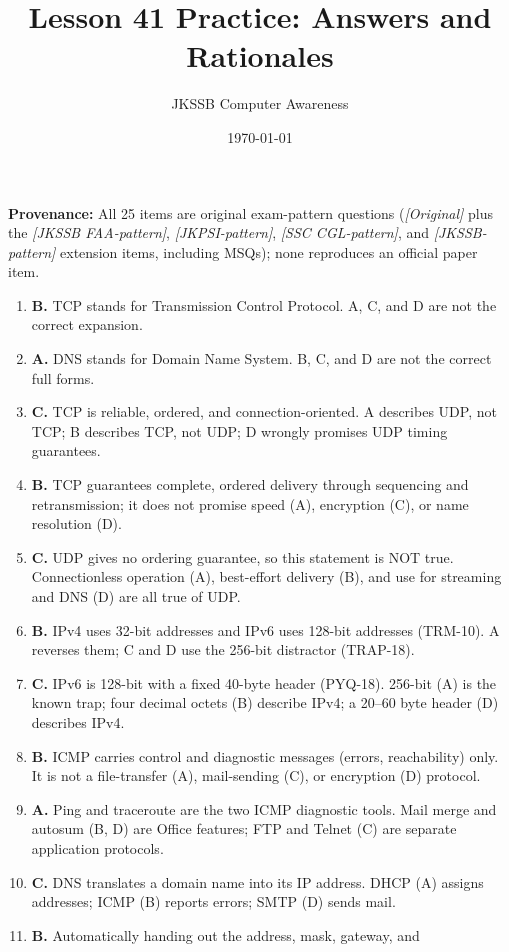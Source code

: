 \documentclass[11pt]{article}
\title{Lesson 41 Practice: Answers and Rationales}
\author{JKSSB Computer Awareness}
\date{\today}
\begin{document}
\maketitle
\noindent\textbf{Provenance:} All 25 items are original exam-pattern questions (\textit{[Original]} plus the \textit{[JKSSB FAA-pattern]}, \textit{[JKPSI-pattern]}, \textit{[SSC CGL-pattern]}, and \textit{[JKSSB-pattern]} extension items, including MSQs); none reproduces an official paper item.
\begin{enumerate}[label=\textbf{Q\arabic*.}, leftmargin=*]
\item \textbf{B.} TCP stands for Transmission Control Protocol. A, C, and D
  are not the correct expansion.
\item \textbf{A.} DNS stands for Domain Name System. B, C, and D are not the
  correct full forms.
\item \textbf{C.} TCP is reliable, ordered, and connection-oriented. A
  describes UDP, not TCP; B describes TCP, not UDP; D wrongly promises UDP
  timing guarantees.
\item \textbf{B.} TCP guarantees complete, ordered delivery through
  sequencing and retransmission; it does not promise speed (A), encryption
  (C), or name resolution (D).
\item \textbf{C.} UDP gives no ordering guarantee, so this statement is NOT
  true. Connectionless operation (A), best-effort delivery (B), and use for
  streaming and DNS (D) are all true of UDP.
\item \textbf{B.} IPv4 uses 32-bit addresses and IPv6 uses 128-bit addresses
  (TRM-10). A reverses them; C and D use the 256-bit distractor (TRAP-18).
\item \textbf{C.} IPv6 is 128-bit with a fixed 40-byte header (PYQ-18).
  256-bit (A) is the known trap; four decimal octets (B) describe IPv4; a
  20--60 byte header (D) describes IPv4.
\item \textbf{B.} ICMP carries control and diagnostic messages (errors,
  reachability) only. It is not a file-transfer (A), mail-sending (C), or
  encryption (D) protocol.
\item \textbf{A.} Ping and traceroute are the two ICMP diagnostic tools. Mail
  merge and autosum (B, D) are Office features; FTP and Telnet (C) are
  separate application protocols.
\item \textbf{C.} DNS translates a domain name into its IP address. DHCP (A)
  assigns addresses; ICMP (B) reports errors; SMTP (D) sends mail.
\item \textbf{B.} Automatically handing out the address, mask, gateway, and

\end{enumerate}
\end{document}
